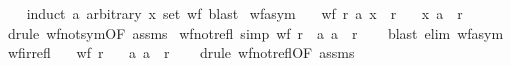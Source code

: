 \begin{isabellebody}
%
\isadelimproof
\ \ %
\endisadelimproof
%
\isatagproof
{}\isamarkupfalse%
\ {\isacharparenleft}{\kern0pt}induct\ a\ arbitrary{\isacharcolon}{\kern0pt}\ x\ set{\isacharcolon}{\kern0pt}\ wf{\isacharparenright}{\kern0pt}\ blast%
\endisatagproof
{\isafoldproof}%
%
\isadelimproof
\isanewline
%
\endisadelimproof
\isanewline
{}\isamarkupfalse%
\ wf{\isacharunderscore}{\kern0pt}asym{\isacharcolon}{\kern0pt}\isanewline
\ \ \ {\isachardoublequoteopen}wf\ r{\isachardoublequoteclose}\ {\isachardoublequoteopen}{\isacharparenleft}{\kern0pt}a{\isacharcomma}{\kern0pt}\ x{\isacharparenright}{\kern0pt}\ {\isasymin}\ r{\isachardoublequoteclose}\isanewline
\ \ \ {\isachardoublequoteopen}{\isacharparenleft}{\kern0pt}x{\isacharcomma}{\kern0pt}\ a{\isacharparenright}{\kern0pt}\ {\isasymnotin}\ r{\isachardoublequoteclose}\isanewline
%
\isadelimproof
\ \ %
\endisadelimproof
%
\isatagproof
{}\isamarkupfalse%
\ {\isacharparenleft}{\kern0pt}drule\ wf{\isacharunderscore}{\kern0pt}not{\isacharunderscore}{\kern0pt}sym{\isacharbrackleft}{\kern0pt}OF\ assms{\isacharbrackright}{\kern0pt}{\isacharparenright}{\kern0pt}%
\endisatagproof
{\isafoldproof}%
%
\isadelimproof
\isanewline
%
\endisadelimproof
\isanewline
{}\isamarkupfalse%
\ wf{\isacharunderscore}{\kern0pt}not{\isacharunderscore}{\kern0pt}refl\ {\isacharbrackleft}{\kern0pt}simp{\isacharbrackright}{\kern0pt}{\isacharcolon}{\kern0pt}\ {\isachardoublequoteopen}wf\ r\ {\isasymLongrightarrow}\ {\isacharparenleft}{\kern0pt}a{\isacharcomma}{\kern0pt}\ a{\isacharparenright}{\kern0pt}\ {\isasymnotin}\ r{\isachardoublequoteclose}\isanewline
%
\isadelimproof
\ \ %
\endisadelimproof
%
\isatagproof
{}\isamarkupfalse%
\ {\isacharparenleft}{\kern0pt}blast\ elim{\isacharcolon}{\kern0pt}\ wf{\isacharunderscore}{\kern0pt}asym{\isacharparenright}{\kern0pt}%
\endisatagproof
{\isafoldproof}%
%
\isadelimproof
\isanewline
%
\endisadelimproof
\isanewline
{}\isamarkupfalse%
\ wf{\isacharunderscore}{\kern0pt}irrefl{\isacharcolon}{\kern0pt}\isanewline
\ \ \ {\isachardoublequoteopen}wf\ r{\isachardoublequoteclose}\isanewline
\ \ \ {\isachardoublequoteopen}{\isacharparenleft}{\kern0pt}a{\isacharcomma}{\kern0pt}\ a{\isacharparenright}{\kern0pt}\ {\isasymnotin}\ r{\isachardoublequoteclose}\isanewline
%
\isadelimproof
\ \ %
\endisadelimproof
%
\isatagproof
{}\isamarkupfalse%
\ {\isacharparenleft}{\kern0pt}drule\ wf{\isacharunderscore}{\kern0pt}not{\isacharunderscore}{\kern0pt}refl{\isacharbrackleft}{\kern0pt}OF\ assms{\isacharbrackright}{\kern0pt}{\isacharparenright}{\kern0pt}%

\end{isabellebody}
